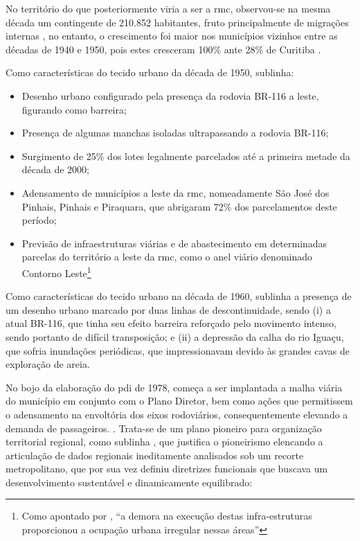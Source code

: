 	No território do que posteriormente viria a ser a \gls{rmc}, observou-se na mesma década um contingente de 210.852 habitantes, fruto principalmente de migrações internas \cite[p. 53]{castro2005a}, no entanto, o crescimento foi maior nos municípios vizinhos entre as décadas de 1940 e 1950, pois estes cresceram 100\% ante 28\% de Curitiba .
	
	Como características do tecido urbano da década de 1950,  sublinha:
	
	\begin{itemize}
		\item Desenho urbano configurado pela presença da rodovia BR-116 a leste, figurando como barreira;
		\item Presença de algumas manchas isoladas ultrapassando a rodovia BR-116;
		\item Surgimento de 25\% dos lotes legalmente parcelados até a primeira metade da década de 2000;
		\item Adensamento de municípios a leste da \gls{rmc}, nomeadamente São José dos Pinhais, Pinhais e Piraquara, que abrigaram 72\% dos parcelamentos deste período;
		\item Previsão de infraestruturas viárias e de abastecimento em determinadas parcelas do território a leste da \gls{rmc}, como o anel viário denominado Contorno Leste\footnote{Como apontado por , ``a demora na execução destas infra-estruturas proporcionou a ocupação urbana irregular nessas áreas''}
	\end{itemize}

	Como características do tecido urbano na década de 1960,  sublinha a presença de um desenho urbano marcado por duas linhas de descontinuidade, sendo (i) a atual BR-116, que tinha seu efeito barreira reforçado pelo movimento intenso, sendo portanto de difícil transposição; e (ii) a depressão da calha do rio Iguaçu, que sofria inundações periódicas, que impressionavam devido às grandes cavas de exploração de areia.

	No bojo da elaboração do \gls{pdi} de 1978, começa a ser implantada a malha viária do município em conjunto com o Plano Diretor, bem como ações que permitissem o adensamento na envoltória dos eixos rodoviários, consequentemente elevando a demanda de passageiros. \cite[p. 53]{castro2005a}. Trata-se de um plano pioneiro para organização territorial regional, como sublinha , que justifica o pioneirismo elencando a articulação de dados regionais ineditamente analisados sob um recorte metropolitano, que por sua vez definiu diretrizes funcionais que buscava um desenvolvimento sustentável e dinamicamente equilibrado:
	
